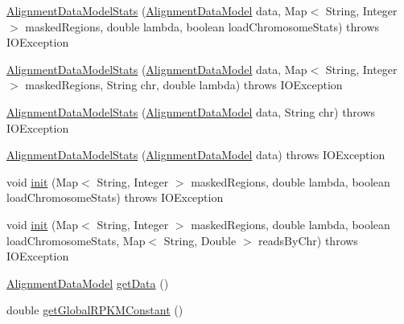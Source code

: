 \begin{DoxyCompactItemize}
\item 
\hyperlink{classbroad_1_1pda_1_1seq_1_1segmentation_1_1_alignment_data_model_stats_ac416e59cdde66cedfafb7f8d8322e032}{Alignment\+Data\+Model\+Stats} (\hyperlink{interfacebroad_1_1pda_1_1seq_1_1segmentation_1_1_alignment_data_model}{Alignment\+Data\+Model} data, Map$<$ String, Integer $>$ masked\+Regions, double lambda, boolean load\+Chromosome\+Stats)  throws I\+O\+Exception 
\item 
\hyperlink{classbroad_1_1pda_1_1seq_1_1segmentation_1_1_alignment_data_model_stats_a2f039427cfa7d41cd249fa1783be3efc}{Alignment\+Data\+Model\+Stats} (\hyperlink{interfacebroad_1_1pda_1_1seq_1_1segmentation_1_1_alignment_data_model}{Alignment\+Data\+Model} data, Map$<$ String, Integer $>$ masked\+Regions, String chr, double lambda)  throws I\+O\+Exception 
\item 
\hyperlink{classbroad_1_1pda_1_1seq_1_1segmentation_1_1_alignment_data_model_stats_a142b001f6827e1d1db761088c877459d}{Alignment\+Data\+Model\+Stats} (\hyperlink{interfacebroad_1_1pda_1_1seq_1_1segmentation_1_1_alignment_data_model}{Alignment\+Data\+Model} data, String chr)  throws I\+O\+Exception 
\item 
\hyperlink{classbroad_1_1pda_1_1seq_1_1segmentation_1_1_alignment_data_model_stats_ad22d8b0842862f28583f8457fad44419}{Alignment\+Data\+Model\+Stats} (\hyperlink{interfacebroad_1_1pda_1_1seq_1_1segmentation_1_1_alignment_data_model}{Alignment\+Data\+Model} data)  throws I\+O\+Exception 
\item 
void \hyperlink{classbroad_1_1pda_1_1seq_1_1segmentation_1_1_alignment_data_model_stats_ac7e9c50f5dfa84a373dc108974fc517d}{init} (Map$<$ String, Integer $>$ masked\+Regions, double lambda, boolean load\+Chromosome\+Stats)  throws I\+O\+Exception
\item 
void \hyperlink{classbroad_1_1pda_1_1seq_1_1segmentation_1_1_alignment_data_model_stats_a040bc3c9f51b2ade134fdfec37c36e7c}{init} (Map$<$ String, Integer $>$ masked\+Regions, double lambda, boolean load\+Chromosome\+Stats, Map$<$ String, Double $>$ reads\+By\+Chr)  throws I\+O\+Exception
\item 
\hyperlink{interfacebroad_1_1pda_1_1seq_1_1segmentation_1_1_alignment_data_model}{Alignment\+Data\+Model} \hyperlink{classbroad_1_1pda_1_1seq_1_1segmentation_1_1_alignment_data_model_stats_a3eec646275a0b6cc0f3e4542c0ca5e0a}{get\+Data} ()
\item 
double \hyperlink{classbroad_1_1pda_1_1seq_1_1segmentation_1_1_alignment_data_model_stats_a88e59059f08c53ca2d159afd4bbc5fe4}{get\+Global\+R\+P\+K\+M\+Constant} ()

\end{DoxyCompactItemize}

